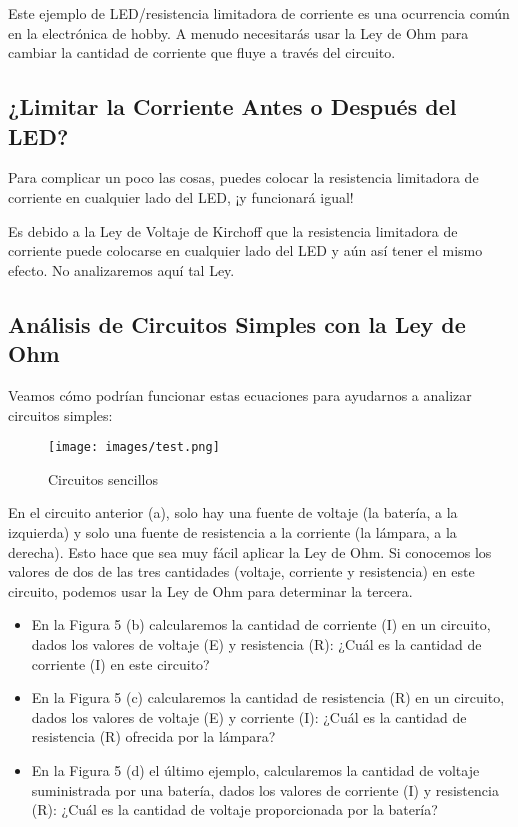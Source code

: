 \documentclass[output=paper, 
colorlinks,
citecolor=brown,
newtxmath
]{langscibook}
\begin{document}
Este ejemplo de LED/resistencia limitadora de corriente es una ocurrencia común en la electrónica de hobby. A menudo necesitarás usar la Ley de Ohm para cambiar la cantidad de corriente que fluye a través del circuito. 

\subsection{¿Limitar la Corriente Antes o Después del LED?}

Para complicar un poco las cosas, puedes colocar la resistencia limitadora de corriente en cualquier lado del LED, ¡y funcionará igual!

Es debido a la Ley de Voltaje de Kirchoff que la resistencia limitadora de corriente puede colocarse en cualquier lado del LED y aún así tener el mismo efecto. No analizaremos aquí tal Ley.

\subsection{Análisis de Circuitos Simples con la Ley de Ohm}
Veamos cómo podrían funcionar estas ecuaciones para ayudarnos a analizar circuitos simples:

\begin{figure}[H]
\texttt{[image: images/test.png]}
\caption{Circuitos sencillos}
\label{fig:unidades}
\end{figure}


En el circuito anterior (a), solo hay una fuente de voltaje (la batería, a la izquierda) y solo una fuente de resistencia a la corriente (la lámpara, a la derecha). Esto hace que sea muy fácil aplicar la Ley de Ohm. Si conocemos los valores de dos de las tres cantidades (voltaje, corriente y resistencia) en este circuito, podemos usar la Ley de Ohm para determinar la tercera.
\begin{itemize}
  \setlength\itemsep{-0.5em}
\item En la Figura 5 (b) calcularemos la cantidad de corriente (I) en un circuito, dados los valores de voltaje (E) y resistencia (R): ¿Cuál es la cantidad de corriente (I) en este circuito?
\item En la Figura 5 (c) calcularemos la cantidad de resistencia (R) en un circuito, dados los valores de voltaje (E) y corriente (I): ¿Cuál es la cantidad de resistencia (R) ofrecida por la lámpara?
\item En la Figura 5 (d) el último ejemplo, calcularemos la cantidad de voltaje suministrada por una batería, dados los valores de corriente (I) y resistencia (R): ¿Cuál es la cantidad de voltaje proporcionada por la batería?
\end{itemize}
\end{document}
